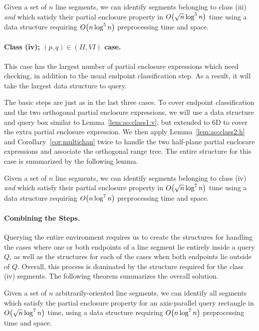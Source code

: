 \begin{lemma}
\label{lem:ao:class3:c}
Given a set of $n$ line segments, we can identify segments belonging to class (iii) \emph{and} which satisfy their partial enclosure property in $O\!\left(\sqrt{n}\log^5{n}\right)$ time using a data structure requiring $O\!\left(n\log^5{n}\right)$ preprocessing time and space.
\end{lemma}


\paragraph{Class (iv); $(p, q) \in (II, VI)$ case.} 
This case has the largest number of partial enclosure expressions which need checking, in addition to the usual endpoint classification step. 
As a result, it will take the largest data structure to query.

The basic steps are just as in the last three cases. 
To cover endpoint classification and the two orthogonal partial enclosure expressions, we will use a data structure and query box similar to Lemma~\ref{lem:ao:class1:v}, but extended to 6D to cover the extra partial enclosure expression.
We then apply Lemma~\ref{lem:ao:class2:h} and Corollary~\ref{cor:multichan} twice to handle the two half-plane partial enclosure expressions and associate the orthogonal range tree. 
The entire structure for this case is summarized by the following lemma.

\begin{lemma}
\label{lem:ao:class4:c}
Given a set of $n$ line segments, we can identify segments belonging to class (iv) \emph{and} which satisfy their partial enclosure property in $O\!\left(\sqrt{n}\log^7{n}\right)$ time using a data structure requiring $O\!\left(n\log^7{n}\right)$ preprocessing time and space.
\end{lemma}


\paragraph{Combining the Steps.} 

Querying the entire environment requires us to create the structures for handling the cases where one or both endpoints of a line segment lie entirely inside a query $Q$, as well as the structures for each of the cases when both endpoints lie outside of $Q$. 
Overall, this process is dominated by the structure required for the class (iv) segments. 
The following theorem summarizes the overall solution.

\begin{theorem}
\label{th:ao}
Given a set of $n$ arbitrarily-oriented line segments, we can identify all segments which satisfy the partial enclosure property for an axis-parallel query rectangle in $O\!\left(\sqrt{n}\log^7{n}\right)$ time, using a data structure requiring $O\!\left(n\log^7{n}\right)$ preprocessing time and space.
\end{theorem}


